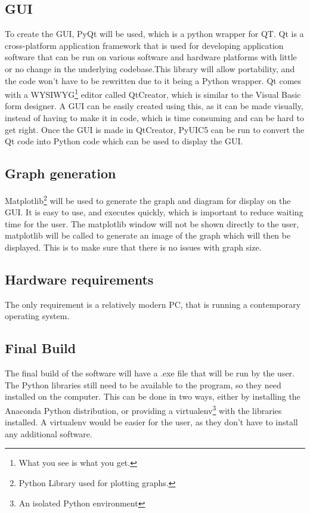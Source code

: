 \subsection{GUI}
To create the GUI, PyQt will be used, which is a python wrapper for QT. Qt is a cross-platform application framework that is used for developing application software that can be run on various software and hardware platforms with little or no change in the underlying codebase\autocite{qt}.This library will allow portability, and the code won't have to be rewritten due to it being a Python wrapper. Qt comes with a WYSIWYG\footnote{What you see is what you get.} editor called QtCreator, which is similar to the Visual Basic form designer. A GUI can be easily created using this, as it can be made visually, instead of having to make it in code, which is time consuming and can be hard to get right. Once the GUI is made in QtCreator, PyUIC5 can be run to convert the Qt code into Python code which can be used to display the GUI.
\subsection{Graph generation}
Matplotlib\footnote{Python Library used for plotting graphs.} will be used to generate the graph and diagram for display on the GUI. It is easy to use, and executes quickly, which is important to reduce waiting time for the user. The matplotlib window will not be shown directly to the user, matplotlib will be called to generate an image of the graph which will then be displayed. This is to make sure that there is no issues with graph size.
\subsection{Hardware requirements}
The only requirement is a relatively modern PC, that is running a contemporary operating system. 
\subsection{Final Build}
The final build of the software will have a .exe file that will be run by the user. The Python libraries still need to be available to the program, so they need installed on the computer. This can be done in two ways, either by installing the Anaconda Python distribution, or providing a virtualenv\footnote{An isolated Python environment} with the libraries installed. A virtualenv would be easier for the user, as they don't have to install any additional software.
